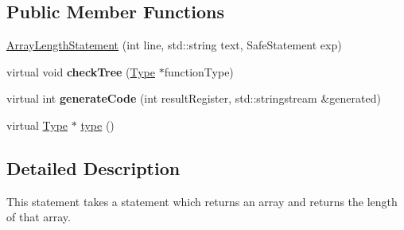 \subsection*{Public Member Functions}
\begin{DoxyCompactItemize}
\item 
\hyperlink{class_scribble_core_1_1_array_length_statement_a0f373eaf826db2565073f5da6b7d3de7}{Array\-Length\-Statement} (int line, std\-::string text, Safe\-Statement exp)
\item 
\hypertarget{class_scribble_core_1_1_array_length_statement_a7861cbb5791ce1d651dad677f000e757}{virtual void {\bfseries check\-Tree} (\hyperlink{class_scribble_core_1_1_type}{Type} $\ast$function\-Type)}\label{class_scribble_core_1_1_array_length_statement_a7861cbb5791ce1d651dad677f000e757}

\item 
\hypertarget{class_scribble_core_1_1_array_length_statement_ae47bb975e562d05b1c3da60b3f7e40aa}{virtual int {\bfseries generate\-Code} (int result\-Register, std\-::stringstream \&generated)}\label{class_scribble_core_1_1_array_length_statement_ae47bb975e562d05b1c3da60b3f7e40aa}

\item 
virtual \hyperlink{class_scribble_core_1_1_type}{Type} $\ast$ \hyperlink{class_scribble_core_1_1_array_length_statement_ac7c1deececdad51dc373ce4942f99ddc}{type} ()
\end{DoxyCompactItemize}


\subsection{Detailed Description}
This statement takes a statement which returns an array and returns the length of that array. 


